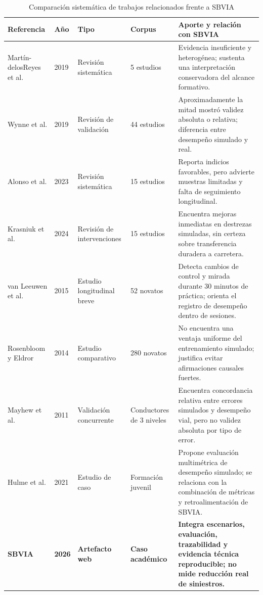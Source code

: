 \documentclass[11pt,a4paper]{report}
\begin{document}
\begin{table}[htbp]
\centering
\caption{Comparación sistemática de trabajos relacionados frente a SBVIA}
\label{tab:trabajos_relacionados}
\footnotesize
\begin{tabularx}{\textwidth}{p{2.8cm}p{1cm}p{2.4cm}p{2.2cm}X}
\toprule
\textbf{Referencia} & \textbf{Año} & \textbf{Tipo} & \textbf{Corpus} & \textbf{Aporte y relación con SBVIA} \\
\midrule
Martín-delosReyes et al. \cite{martin2019simulator} & 2019 & Revisión sistemática & 5 estudios & Evidencia insuficiente y heterogénea; sustenta una interpretación conservadora del alcance formativo. \\
Wynne et al. \cite{wynne2019validation} & 2019 & Revisión de validación & 44 estudios & Aproximadamente la mitad mostró validez absoluta o relativa; diferencia entre desempeño simulado y real. \\
Alonso et al. \cite{alonso2023simulators} & 2023 & Revisión sistemática & 15 estudios & Reporta indicios favorables, pero advierte muestras limitadas y falta de seguimiento longitudinal. \\
Krasniuk et al. \cite{krasniuk2024simulator} & 2024 & Revisión de intervenciones & 15 estudios & Encuentra mejoras inmediatas en destrezas simuladas, sin certeza sobre transferencia duradera a carretera. \\
van Leeuwen et al. \cite{vanleeuwen2015changes} & 2015 & Estudio longitudinal breve & 52 novatos & Detecta cambios de control y mirada durante 30 minutos de práctica; orienta el registro de desempeño dentro de sesiones. \\
Rosenbloom y Eldror \cite{rosenbloom2014workshops} & 2014 & Estudio comparativo & 280 novatos & No encuentra una ventaja uniforme del entrenamiento simulado; justifica evitar afirmaciones causales fuertes. \\
Mayhew et al. \cite{mayhew2011validation} & 2011 & Validación concurrente & Conductores de 3 niveles & Encuentra concordancia relativa entre errores simulados y desempeño vial, pero no validez absoluta por tipo de error. \\
Hulme et al. \cite{hulme2021blueprint} & 2021 & Estudio de caso & Formación juvenil & Propone evaluación multimétrica de desempeño simulado; se relaciona con la combinación de métricas y retroalimentación de SBVIA. \\
\textbf{SBVIA} & \textbf{2026} & \textbf{Artefacto web} & \textbf{Caso académico} & \textbf{Integra escenarios, evaluación, trazabilidad y evidencia técnica reproducible; no mide reducción real de siniestros.} \\
\bottomrule
\end{tabularx}
\end{table}
\end{document}
